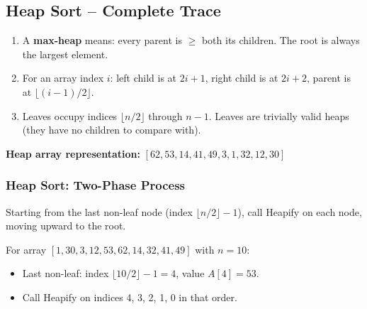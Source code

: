 \documentclass[12pt,portrait]{article}
\begin{document}
\subsection{Heap Sort -- Complete Trace}
\label{sec:heap}

\begin{rulebox}
\begin{enumerate}[leftmargin=*]
    \item A \textbf{max-heap} means: every parent is $\geq$ both its children. The root is always the largest element.
    \item For an array index $i$: left child is at $2i+1$, right child is at $2i+2$, parent is at $\lfloor(i-1)/2\rfloor$.
    \item Leaves occupy indices $\lfloor n/2\rfloor$ through $n-1$. Leaves are trivially valid heaps (they have no children to compare with).
\end{enumerate}
\end{rulebox}

\begin{center}
\end{center}

\textbf{Heap array representation:} $[62, 53, 14, 41, 49, 3, 1, 32, 12, 30]$

\subsubsection{Heap Sort: Two-Phase Process}

\begin{rulebox}
Starting from the last non-leaf node (index $\lfloor n/2\rfloor-1$), call Heapify on each node, moving upward to the root.

For array $[1, 30, 3, 12, 53, 62, 14, 32, 41, 49]$ with $n=10$:
\begin{itemize}[leftmargin=*]
    \item Last non-leaf: index $\lfloor 10/2\rfloor - 1 = 4$, value $A[4]=53$.
    \item Call Heapify on indices 4, 3, 2, 1, 0 in that order.
\end{itemize}
\end{rulebox}
\end{document}
